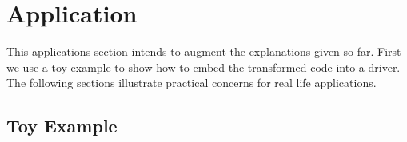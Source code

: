 \documentclass{book}
\begin{document}
\chapter{Application}\label{sec:application}
This applications section intends to augment the explanations given so far. 
First we use a toy example to show how to embed the transformed code into 
a driver. The following sections illustrate practical concerns for real 
life applications. 
\section{Toy Example}\label{sec:toyExample}
\end{document}
